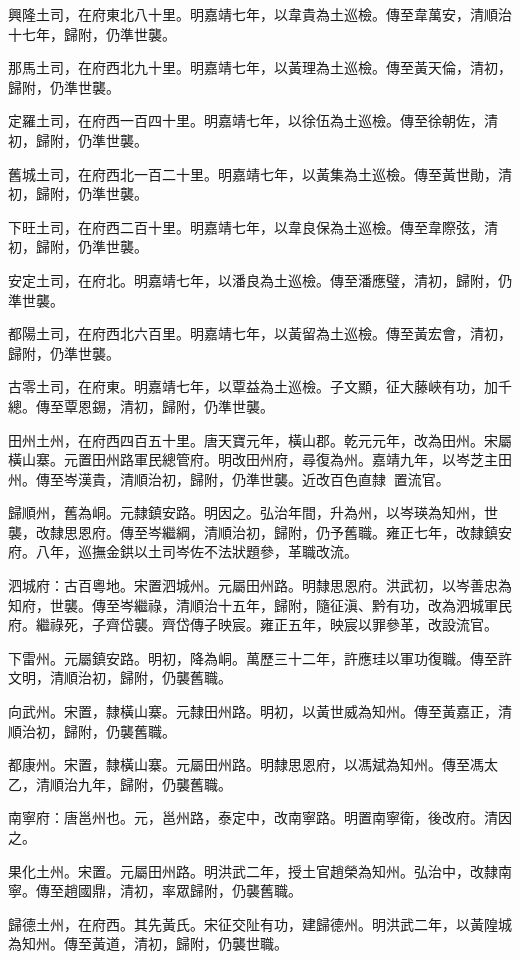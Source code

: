 \begin{pinyinscope}
興隆土司，在府東北八十里。明嘉靖七年，以韋貴為土巡檢。傳至韋萬安，清順治十七年，歸附，仍準世襲。

那馬土司，在府西北九十里。明嘉靖七年，以黃理為土巡檢。傳至黃天倫，清初，歸附，仍準世襲。

定羅土司，在府西一百四十里。明嘉靖七年，以徐伍為土巡檢。傳至徐朝佐，清初，歸附，仍準世襲。

舊城土司，在府西北一百二十里。明嘉靖七年，以黃集為土巡檢。傳至黃世勛，清初，歸附，仍準世襲。

下旺土司，在府西二百十里。明嘉靖七年，以韋良保為土巡檢。傳至韋際弦，清初，歸附，仍準世襲。

安定土司，在府北。明嘉靖七年，以潘良為土巡檢。傳至潘應璧，清初，歸附，仍準世襲。

都陽土司，在府西北六百里。明嘉靖七年，以黃留為土巡檢。傳至黃宏會，清初，歸附，仍準世襲。

古零土司，在府東。明嘉靖七年，以覃益為土巡檢。子文顯，征大藤峽有功，加千總。傳至覃恩錫，清初，歸附，仍準世襲。

田州土州，在府西四百五十里。唐天寶元年，橫山郡。乾元元年，改為田州。宋屬橫山寨。元置田州路軍民總管府。明改田州府，尋復為州。嘉靖九年，以岑芝主田州。傳至岑漢貴，清順治初，歸附，仍準世襲。近改百色直隸，置流官。

歸順州，舊為峒。元隸鎮安路。明因之。弘治年間，升為州，以岑瑛為知州，世襲，改隸思恩府。傳至岑繼綱，清順治初，歸附，仍予舊職。雍正七年，改隸鎮安府。八年，巡撫金鉷以土司岑佐不法狀題參，革職改流。

泗城府：古百粵地。宋置泗城州。元屬田州路。明隸思恩府。洪武初，以岑善忠為知府，世襲。傳至岑繼祿，清順治十五年，歸附，隨征滇、黔有功，改為泗城軍民府。繼祿死，子齊岱襲。齊岱傳子映宸。雍正五年，映宸以罪參革，改設流官。

下雷州。元屬鎮安路。明初，降為峒。萬歷三十二年，許應珪以軍功復職。傳至許文明，清順治初，歸附，仍襲舊職。

向武州。宋置，隸橫山寨。元隸田州路。明初，以黃世威為知州。傳至黃嘉正，清順治初，歸附，仍襲舊職。

都康州。宋置，隸橫山寨。元屬田州路。明隸思恩府，以馮斌為知州。傳至馮太乙，清順治九年，歸附，仍襲舊職。

南寧府：唐邕州也。元，邕州路，泰定中，改南寧路。明置南寧衛，後改府。清因之。

果化土州。宋置。元屬田州路。明洪武二年，授土官趙榮為知州。弘治中，改隸南寧。傳至趙國鼎，清初，率眾歸附，仍襲舊職。

歸德土州，在府西。其先黃氏。宋征交阯有功，建歸德州。明洪武二年，以黃隍城為知州。傳至黃道，清初，歸附，仍襲世職。


\end{pinyinscope}
